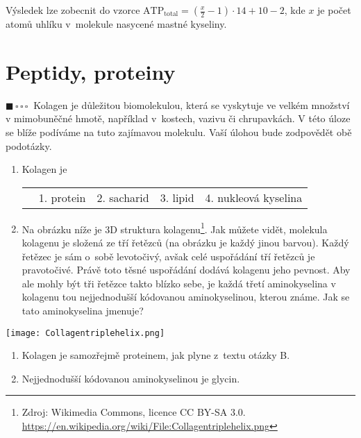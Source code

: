 \documentclass{book}
\newcommand{\jeden}{$\blacksquare \, \square \, \square \, \square \; \; $}
\renewenvironment{quotation}{\par}{\par} %
\begin{document}
Výsledek lze zobecnit do vzorce $\mathrm{ATP_{total}}=(\frac{x}{2}-1)\cdot14+10-2$,
kde $x$ je počet atomů uhlíku v~molekule nasycené mastné kyseliny. 

\newpage %
\section{Peptidy, proteiny}

\begin{quotation}
\jeden Kolagen je důležitou biomolekulou, která se vyskytuje ve velkém množství
v mimobuněčné hmotě, například v~kostech, vazivu či chrupavkách.
V této úloze se blíže podíváme na tuto zajímavou molekulu. Vaší úlohou
bude zodpovědět obě podotázky.


\begin{enumerate}[label=\Alph*.] 
\item Kolagen je\\
\begin{tabular}{ccccc}
 & 1. protein & 2. sacharid & 3. lipid & 4. nukleová kyselina\tabularnewline
\end{tabular}
\item Na obrázku níže je 3D struktura kolagenu\footnote{Zdroj: Wikimedia Commons, licence CC BY-SA 3.0. \href{https://en.wikipedia.org/wiki/File:Collagentriplehelix.png}{https://en.wikipedia.org/wiki/File:Collagentriplehelix.png}}. Jak můžete vidět, molekula
kolagenu je složená ze tří řetězců (na obrázku je každý jinou barvou).
Každý řetězec je sám o~sobě levotočivý, avšak celé uspořádání tří řetězců
je pravotočivé. Právě toto těsné uspořádání dodává kolagenu jeho pevnost.
Aby ale mohly být tři řetězce takto blízko sebe, je každá třetí aminokyselina
v kolagenu tou nejjednodušší kódovanou aminokyselinou, kterou známe.
Jak se tato aminokyselina jmenuje?
\end{enumerate}
\begin{center}
\texttt{[image: Collagentriplehelix.png]}
\par\end{center}
\end{quotation} \dotfill \par 

\begin{enumerate}
\item Kolagen je samozřejmě proteinem, jak plyne z~textu otázky B. 
\item Nejjednodušší kódovanou aminokyselinou je glycin. 
\end{enumerate}
\end{document}
